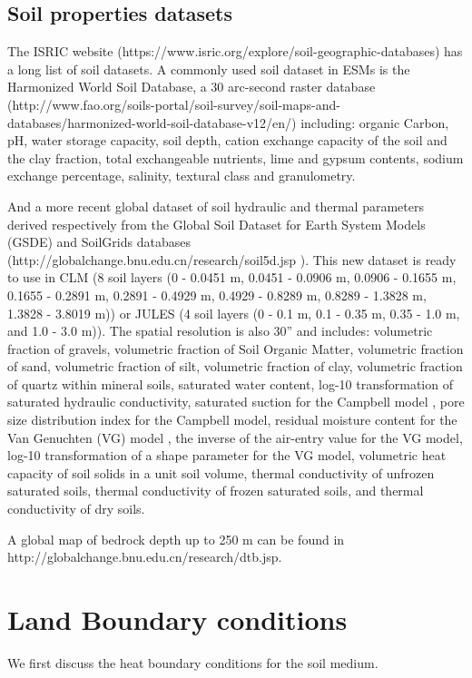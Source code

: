 \documentclass{article}
\begin{document}
\subsection{Soil properties datasets}
The ISRIC website (https://www.isric.org/explore/soil-geographic-databases) has a long list of soil datasets. A commonly used soil dataset in ESMs is the Harmonized World Soil Database, a 30 arc-second raster database (http://www.fao.org/soils-portal/soil-survey/soil-maps-and-databases/harmonized-world-soil-database-v12/en/) including: organic Carbon, pH, water storage capacity, soil depth, cation exchange capacity of the soil and the clay fraction, total exchangeable nutrients, lime and gypsum contents, sodium exchange percentage, salinity, textural class and granulometry.
 
And a more recent global dataset of soil hydraulic and thermal parameters derived respectively from the Global Soil Dataset for Earth System Models (GSDE) \citep{Shangguan2014} and SoilGrids \citep{Hengl2014,Hengl2017} databases (http://globalchange.bnu.edu.cn/research/soil5d.jsp ). This new dataset is ready to use in CLM (8 soil layers (0 - 0.0451 m, 0.0451 - 0.0906 m, 0.0906 - 0.1655 m, 0.1655 - 0.2891 m, 0.2891 - 0.4929 m, 0.4929 - 0.8289 m, 0.8289 - 1.3828 m, 1.3828 - 3.8019 m)) or JULES (4 soil layers (0 - 0.1 m, 0.1 - 0.35 m, 0.35 - 1.0 m, and 1.0 - 3.0 m)). The spatial resolution is also 30” and includes: volumetric fraction of gravels, volumetric fraction of Soil Organic Matter, volumetric fraction of sand, volumetric fraction of silt, volumetric fraction of clay, volumetric fraction of quartz within mineral soils, saturated water content, log-10 transformation of saturated hydraulic conductivity, saturated suction for the Campbell model \citep{Campbell1974}, pore size distribution index for the Campbell model, residual moisture content for the Van Genuchten  (VG) model \citep{VanGenuchten1980}, the inverse of the air-entry value for the VG model, log-10 transformation of a shape parameter for the VG model, volumetric heat capacity of soil solids in a unit soil volume, thermal conductivity of unfrozen saturated soils, thermal conductivity of frozen saturated soils, and thermal conductivity of dry soils.
 
A global map of bedrock depth up to 250 m can be found in  http://globalchange.bnu.edu.cn/research/dtb.jsp.




\section{Land Boundary conditions}
We first discuss the heat boundary conditions for the soil medium.
\end{document}

